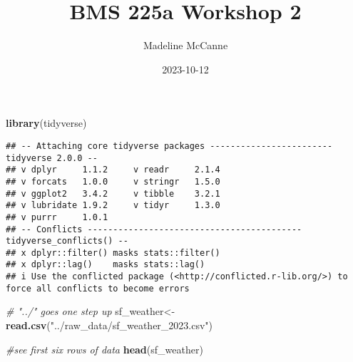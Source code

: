 \documentclass[
]{article}
\title{BMS 225a Workshop 2}
\author{Madeline McCanne}
\date{2023-10-12}
\newenvironment{Shaded}{\begin{snugshade}}{\end{snugshade}}
\newcommand{\CommentTok}[1]{\textcolor[rgb]{0.56,0.35,0.01}{\textit{#1}}}
\newcommand{\FunctionTok}[1]{\textcolor[rgb]{0.13,0.29,0.53}{\textbf{#1}}}
\newcommand{\NormalTok}[1]{#1}
\newcommand{\OtherTok}[1]{\textcolor[rgb]{0.56,0.35,0.01}{#1}}
\newcommand{\StringTok}[1]{\textcolor[rgb]{0.31,0.60,0.02}{#1}}
\begin{document}
\maketitle

\begin{Shaded}
\begin{Highlighting}[]
\FunctionTok{library}\NormalTok{(tidyverse)}
\end{Highlighting}
\end{Shaded}

\begin{verbatim}
## -- Attaching core tidyverse packages ------------------------ tidyverse 2.0.0 --
## v dplyr     1.1.2     v readr     2.1.4
## v forcats   1.0.0     v stringr   1.5.0
## v ggplot2   3.4.2     v tibble    3.2.1
## v lubridate 1.9.2     v tidyr     1.3.0
## v purrr     1.0.1     
## -- Conflicts ------------------------------------------ tidyverse_conflicts() --
## x dplyr::filter() masks stats::filter()
## x dplyr::lag()    masks stats::lag()
## i Use the conflicted package (<http://conflicted.r-lib.org/>) to force all conflicts to become errors
\end{verbatim}

\begin{Shaded}
\begin{Highlighting}[]
\CommentTok{\# "../" goes one step up}
\NormalTok{sf\_weather}\OtherTok{\textless{}{-}} \FunctionTok{read.csv}\NormalTok{(}\StringTok{"../raw\_data/sf\_weather\_2023.csv"}\NormalTok{)}

\CommentTok{\#see first six rows of data}
\FunctionTok{head}\NormalTok{(sf\_weather) }
\end{Highlighting}
\end{Shaded}
\end{document}
